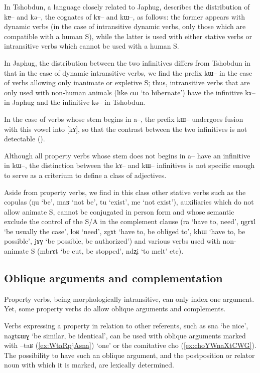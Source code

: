 \documentclass[oldfontcommands,oneside,a4paper,11pt]{article}
\newcommand{\ipa}[1]{{\phon \mbox{#1}}} %
\begin{document}
In Tshobdun, a language closely related to Japhug, \citet[493]{jackson03caodeng} describes the distribution of \ipa{kɐ--} and \ipa{kə--}, the cognates of \ipa{kɤ--} and \ipa{kɯ--}, as follows: the former appears with dynamic verbs (in the case of intransitive dynamic verbs, only those which are compatible with a human S), while the latter is used with either stative verbs or intransitive verbs which cannot be used with a human S. 

In Japhug, the distribution between the two infinitives differs from Tshobdun in that in the case of dynamic intransitive verbs, we find the prefix \ipa{kɯ--} in the case of verbs allowing only inanimate or expletive S; thus, intransitive verbs that are only used with non-human animals (like \ipa{cɯ} `to hibernate') have the infinitive \ipa{kɤ--} in Japhug and the infinitive \ipa{kə--} in Tshobdun.

In the case of verbs whose stem begins in \ipa{a--}, the prefix \ipa{kɯ--} undergoes fusion with this vowel into [kɤ], so that the contrast between the two infinitives is not detectable (\citealt{jacques07passif}).

Although all property verbs whose stem does not begins in \ipa{a--} have an infinitive in \ipa{kɯ--}, the distinction between the \ipa{kɤ--} and \ipa{kɯ--} infinitives is   not specific enough to serve as a criterium to define a class of adjectives. 

Aside from property verbs, we find in this class other stative verbs such as the copulas (\ipa{ŋu} `be', \ipa{maʁ} `not be', \ipa{tu} `exist', \ipa{me} `not exist'), auxiliaries which do not allow animate S, cannot be conjugated in person form and whose semantic exclude the control of the S/A in the complement clause (\ipa{ra} `have to, need', \ipa{ŋgrɤl} `be usually the case', \ipa{ɬoʁ} `need', \ipa{zgɤt} `have to, be obliged to', \ipa{khɯ} `have to, be possible', \ipa{jɤɣ} `be possible, be authorized') and various verbs used with non-animate S (\ipa{mbrɤt} `be cut, be stopped', \ipa{ndʐi} `to melt' etc).
 

\subsection{Oblique arguments and complementation} \label{sec:complement}
Property verbs, being morphologically intransitive, can only index one argument. Yet, some property verbs do allow oblique arguments and complements.


Verbs expressing a property in relation to other referents, such as \ipa{sna} `be nice', \ipa{naχtɕɯɣ} `be similar, be identical', can be used with oblique arguments marked with  \ipa{--taʁ} (\ref{ex:WtaRpjAsna}) `one' or the comitative \ipa{cho}  (\ref{ex:choYWnaXtCWG}). The possibility to have such an oblique argument, and the postposition or relator noun with which it is marked, are lexically determined.
\end{document}
